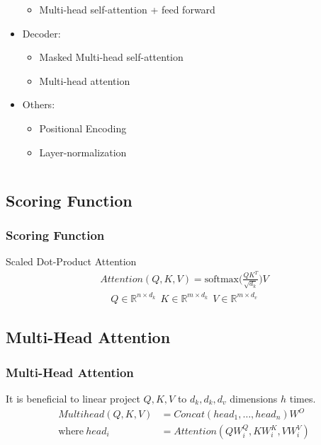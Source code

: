 \documentclass[]{beamer}
\newcommand{\bb}[1]{\mathbb{#1}}
\newcommand{\x}{\times}
\begin{document}
\begin{frame}
\begin{columns}
\begin{column}{0.5\textwidth}
\begin{itemize}
\begin{itemize}
                        \item Multi-head self-attention + feed forward
                    \end{itemize}
                \item Decoder: 
                    \begin{itemize}
                        \item Masked Multi-head self-attention
                        \item Multi-head attention
                    \end{itemize}
                \item Others:
                    \begin{itemize}
                        \item Positional Encoding
                        \item Layer-normalization
                    \end{itemize}
            \end{itemize}
                    
        \end{column}
    \end{columns}
\end{frame}

\subsection{Scoring Function}
\begin{frame}
    \frametitle{Scoring Function}
    Scaled Dot-Product Attention
    \begin{align*}
        Attention(Q, K, V) = \text{softmax} \Biggl(\frac{QK^T}{\sqrt{d_k}}\Biggr) V
    \end{align*}
    \begin{align*}
        Q \in \bb{R}^{n\x d_k}~~K \in \bb{R}^{m\x d_k}~~V\in \bb{R}^{m\x d_v}
    \end{align*}
\end{frame}

\subsection{Multi-Head Attention}
\begin{frame}
    \frametitle{Multi-Head Attention}
    It is beneficial to linear project $Q, K, V$ to $d_k, d_k, d_v$ dimensions $h$ times.
    \begin{align*}
        Multihead(Q,K,V) &= Concat(head_1, \ldots, head_n) W^O \\
        \text{where}~head_i &= Attention(QW_i^Q, KW_i^K, VW_i^V)
    \end{align*}
\end{frame}
\end{document}
